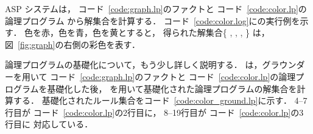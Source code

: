 




ASP システムは，
コード~\ref{code:graph.lp}のファクトと
コード~\ref{code:color.lp}の論理プログラム
から解集合を計算する．
コード~\ref{code:color.log}に{\clingo}の実行例を示す．
色を赤，色を青，色を黄とすると，
得られた解集合\{
,
,
,
\}
は，図~\ref{fig:graph}の右側の彩色を表す．

論理プログラムの基礎化について，もう少し詳しく説明する．
{\clingo}は，グラウンダー{\gringo}を用いて
コード~\ref{code:graph.lp}のファクトと
コード~\ref{code:color.lp}の論理プログラムを基礎化した後，
{\clasp}を用いて基礎化された論理プログラムの解集合を計算する．
基礎化されたルール集合をコード~\ref{code:color_ground.lp}に示す．
4--7行目が
コード~\ref{code:color.lp}の2行目に，
8--19行目が
コード~\ref{code:color.lp}の3行目に
対応している．

